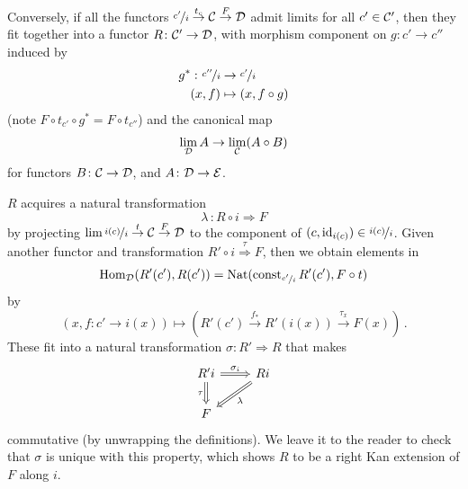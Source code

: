         Conversely, if all the functors $\nicefrac{c'}{i} \overset{t_c}{\rightarrow} \mathcal{C} \overset{F}{\rightarrow} \mathcal{D}$ admit limits for all $c' \in \mathcal{C}'$, then they fit together into a functor $R \colon \mathcal{C}' \to \mathcal{D}$, with morphism component on $g \colon c' \to c''$ induced by
        \begin{align*}
            g^* \,\colon \nicefrac{c''}{i} &\to \nicefrac{c'}{i} \\
            (x, f) &\mapsto (x, f \circ g)
        \end{align*}
        (note $F \circ t_{c'} \circ g^* = F \circ t_{c''}$) and the canonical map
        \begin{equation*}
            \lim\limits_{\mathcal{D}} A \to \lim\limits_{\mathcal{C}} (A \circ B)
        \end{equation*}
        for functors $B \colon \mathcal{C} \to \mathcal{D}$, and $A \colon \mathcal{D} \to \mathcal{E}$.

        $R$ acquires a natural transformation
        \begin{equation*}
            \lambda \,\colon R \circ i \Rightarrow F
        \end{equation*}
        by projecting $\lim \nicefrac{i(c)}{i} \overset{t}{\rightarrow} \mathcal{C} \overset{F}{\rightarrow} \mathcal{D}$ to the component of $(c, \operatorname{id}_{i(c)}) \in \nicefrac{i(c)}{i}$. Given another functor and transformation $R' \circ i \overset{\tau}{\Rightarrow} F$, then we obtain elements in
        \begin{equation*}
            \operatorname{Hom}_{\mathcal{D}}(R'(c'), R(c')) = \operatorname{Nat}(\operatorname{const}_{\nicefrac{c'}{i}}R'(c'), F \circ t)
        \end{equation*}
        by
        \begin{equation*}
            (x, f \colon c' \to i(x)) \mapsto (R'(c') \overset{f_*}{\rightarrow} R'(i(x)) \overset{\tau_x}{\rightarrow} F(x)) \,.
        \end{equation*}
        These fit into a natural transformation $\sigma \colon R' \Rightarrow R$ that makes
        \begin{equation*}
            \begin{tikzcd}
                R'i \arrow[r, "\sigma_i", Rightarrow] \arrow[d, "\tau"', Rightarrow] & Ri \arrow[ld, "\lambda", Rightarrow] \\
                F                                                                    &                                     
            \end{tikzcd}
        \end{equation*}
        commutative (by unwrapping the definitions). We leave it to the reader to check that $\sigma$ is unique with this property, which shows $R$ to be a right Kan extension of $F$ along $i$.

